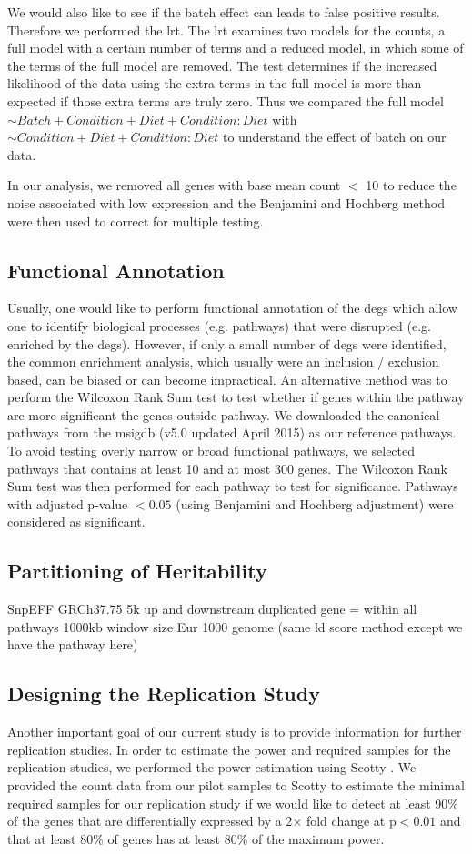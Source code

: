 We would also like to see if the batch effect can leads to false positive results.
Therefore we performed the \gls{lrt}.
The \gls{lrt} examines two models for the counts, a full model with a certain number of terms and a reduced model, in which some of the terms of the full model are removed. 
The test determines if the increased likelihood of the data using the extra terms in the full model is more than expected if those extra terms are truly zero.
Thus we compared the full model $\sim Batch+Condition+Diet+Condition:Diet$ with $\sim Condition+Diet+Condition:Diet$ to understand the effect of batch on our data.

In our analysis, we removed all genes with base mean count $<$ 10  to reduce the noise associated with low expression and the Benjamini and Hochberg method were then used to correct for multiple testing.

\subsection{Functional Annotation}
Usually, one would like to perform functional annotation of the \glspl{deg} which allow one to identify biological processes (e.g. pathways) that were disrupted (e.g. enriched by the \glspl{deg}).
However, if only a small number of \glspl{deg} were identified, the common enrichment analysis, which usually were an inclusion / exclusion based, can be biased or can become impractical. 
An alternative method was to perform the Wilcoxon Rank Sum test to test whether if genes within the pathway are more significant the genes outside pathway.
We downloaded the canonical pathways from the \gls{msigdb} (v5.0 updated April 2015) \citep{Subramanian2005} as our reference pathways.
To avoid testing overly narrow or broad functional pathways, we selected pathways that contains at least 10 and at most 300 genes.
The Wilcoxon Rank Sum test was then performed for each pathway to test for significance.
Pathways with adjusted p-value $<0.05$ (using Benjamini and Hochberg adjustment) were considered as significant.

\subsection{Partitioning of Heritability}
SnpEFF GRCh37.75
5k up and downstream
duplicated gene = within all pathways
1000kb window size
Eur 1000 genome (same ld score method except we have the pathway here)


\subsection{Designing the Replication Study}
Another important goal of our current study is to provide information for further replication studies. 
In order to estimate the power and required samples for the replication studies, we performed the power estimation using Scotty \citep{Busby2013}.
We provided the count data from our pilot samples to Scotty to estimate the minimal required samples for our replication study if we would like to detect at least 90\% of the genes that are differentially expressed by a 2$\times$ fold change at p$<0.01$ and that at least 80\% of genes has at least 80\% of the maximum power.


